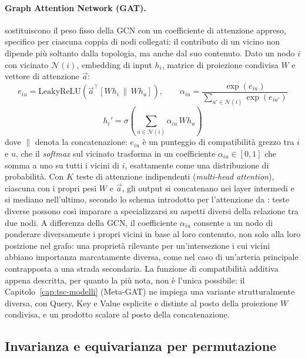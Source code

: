 \paragraph{Graph Attention Network (GAT).} \citet{velickovic2018gat}
sostituiscono il peso fisso della GCN con un coefficiente di attenzione
appreso, specifico per ciascuna coppia di nodi collegati: il contributo di
un vicino non dipende più soltanto dalla topologia, ma anche dal suo
contenuto. Dato un nodo $i$ con vicinato $\mathcal{N}(i)$, embedding di
input $h_i$, matrice di proiezione condivisa $W$ e vettore di attenzione
$\vec a$:
\begin{equation}
  e_{iu} = \mathrm{LeakyReLU}\!\left(\vec a^\top [W h_i \,\|\, W h_u]\right),
  \qquad
  \alpha_{iu} = \frac{\exp(e_{iu})}{\sum_{u' \in \mathcal{N}(i)} \exp(e_{iu'})}
  \label{eq:gat-attention}
\end{equation}
\begin{equation}
  h_i' = \sigma\!\left(\sum_{u \in \mathcal{N}(i)} \alpha_{iu}\, W h_u\right)
  \label{eq:gat-aggregate}
\end{equation}
dove $\|$ denota la concatenazione: $e_{iu}$ è un punteggio di
compatibilità grezzo tra $i$ e $u$, che il \emph{softmax} sul vicinato
trasforma in un coefficiente $\alpha_{iu} \in [0,1]$ che somma a uno su
tutti i vicini di $i$, esattamente come una distribuzione di probabilità.
Con $K$ teste di attenzione indipendenti (\emph{multi-head attention}),
ciascuna con i propri pesi $W$ e $\vec a$, gli output si concatenano nei
layer intermedi e si mediano nell'ultimo, secondo lo schema introdotto per
l'attenzione da \citet{vaswani2017attention}: teste diverse possono così
imparare a specializzarsi su aspetti diversi della relazione tra due nodi.
A differenza della GCN, il coefficiente $\alpha_{iu}$ consente a un nodo
di ponderare diversamente i propri vicini in base al loro contenuto, non
solo alla loro posizione nel grafo: una proprietà rilevante per
un'intersezione i cui vicini abbiano importanza marcatamente diversa,
come nel caso di un'arteria principale contrapposta a una strada
secondaria. La funzione di compatibilità additiva appena descritta, per
quanto la più nota, non è l'unica possibile: il Capitolo~\ref{cap:tsc-modelli}
(Meta-GAT) ne impiega una variante strutturalmente diversa, con Query, Key
e Value esplicite e distinte al posto della proiezione $W$ condivisa, e un
prodotto scalare al posto della concatenazione.

\subsection{Invarianza e equivarianza per permutazione}
\label{subsec:permutation-invariance}

